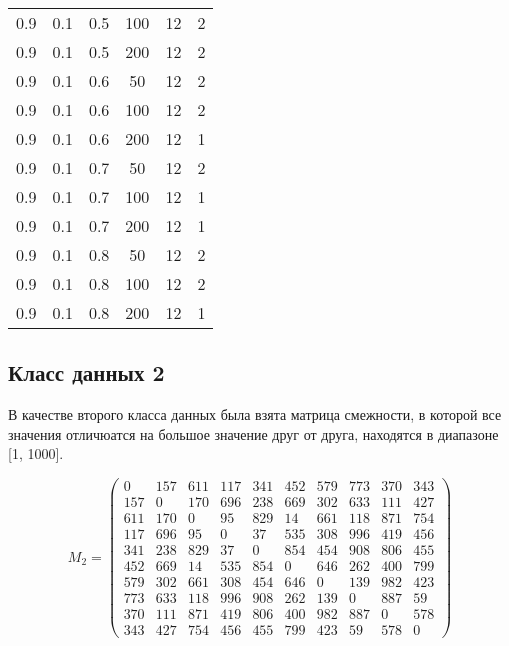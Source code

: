 \begin{center}
\begin{longtable}[c]{|c|c|c|c|c|c|}
	0.9 &  0.1 &  0.5 &  100 &    12 &     2 \\
	0.9 &  0.1 &  0.5 &  200 &    12 &     2 \\
   \hline
	0.9 &  0.1 &  0.6 &   50 &    12 &     2 \\
	0.9 &  0.1 &  0.6 &  100 &    12 &     2 \\
	0.9 &  0.1 &  0.6 &  200 &    12 &     1 \\
   \hline
	0.9 &  0.1 &  0.7 &   50 &    12 &     2 \\
	0.9 &  0.1 &  0.7 &  100 &    12 &     1 \\
	0.9 &  0.1 &  0.7 &  200 &    12 &     1 \\
   \hline
	0.9 &  0.1 &  0.8 &   50 &    12 &     2 \\
	0.9 &  0.1 &  0.8 &  100 &    12 &     2 \\
	0.9 &  0.1 &  0.8 &  200 &    12 &     1 \\
   \hline
\end{longtable}
\end{center}

\clearpage

\subsection{Класс данных 2}

В качестве второго класса данных была взята матрица смежности, в которой все значения отличюатся на большое значение друг от друга, находятся в диапазоне [1, 1000].

\begin{equation}
    \label{eq:kd2}
	M_{2} = \begin{pmatrix}
		0 & 157 & 611 & 117 & 341 & 452 & 579 & 773 & 370 & 343 \\
		157 & 0 & 170 & 696 & 238 & 669 & 302 & 633 & 111 & 427 \\
		611 & 170 & 0 & 95 & 829 & 14 & 661 & 118 & 871 & 754 \\
		117 & 696 & 95 & 0 & 37 & 535 & 308 & 996 & 419 & 456 \\
		341 & 238 & 829 & 37 & 0 & 854 & 454 & 908 & 806 & 455 \\
		452 & 669 & 14 & 535 & 854 & 0 & 646 & 262 & 400 & 799 \\
		579 & 302 & 661 & 308 & 454 & 646 & 0 & 139 & 982 & 423 \\
		773 & 633 & 118 & 996 & 908 & 262 & 139 & 0 & 887 & 59 \\
		370 & 111 & 871 & 419 & 806 & 400 & 982 & 887 & 0 & 578 \\
		343 & 427 & 754 & 456 & 455 & 799 & 423 & 59 & 578 & 0 
	\end{pmatrix}
\end{equation}


